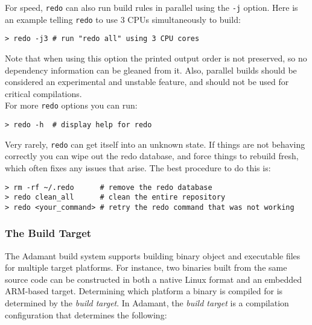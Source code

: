 For speed, \texttt{redo} can also run build rules in parallel using the \texttt{-j} option. Here is an example telling \texttt{redo} to use 3 CPUs simultaneously to build:

\vspace{5mm} %
\begin{verbatim}
> redo -j3 # run "redo all" using 3 CPU cores
\end{verbatim}
\vspace{5mm} %

Note that when using this option the printed output order is not preserved, so no dependency information can be gleaned from it. Also, parallel builds should be considered an experimental and unstable feature, and should not be used for critical compilations. \\

For more \texttt{redo} options you can run:

\vspace{5mm} %
\begin{verbatim}
> redo -h  # display help for redo
\end{verbatim}
\vspace{5mm} %

Very rarely, \texttt{redo} can get itself into an unknown state. If things are not behaving correctly you can wipe out the redo database, and force things to rebuild fresh, which often fixes any issues that arise. The best procedure to do this is:

\vspace{5mm} %
\begin{verbatim}
> rm -rf ~/.redo      # remove the redo database
> redo clean_all      # clean the entire repository
> redo <your_command> # retry the redo command that was not working
\end{verbatim}
\vspace{5mm} %

\subsubsection{The Build Target} \label{The Build Target}

The Adamant build system supports building binary object and executable files for multiple target platforms. For instance, two binaries built from the same source code can be constructed in both a native Linux format and an embedded ARM-based target. Determining which platform a binary is compiled for is determined by the \textit{build target}. In Adamant, the \textit{build target} is a compilation configuration that determines the following:

